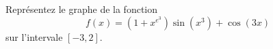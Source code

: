 \begin{exercice}\label{exoMatlab0018}

Représentez le graphe de la fonction 
\[ f(x) = (1+x^{e^3})\sin(x^3) + \cos(3x) \]
sur l'intervale $[-3,2]$.

\end{exercice}

